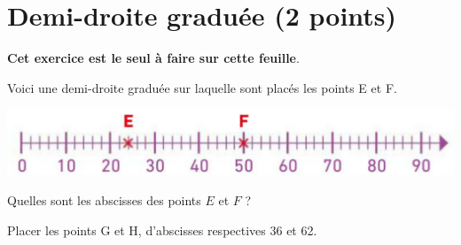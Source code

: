 \section{Demi-droite graduée (2 points)}

{\Large \textbf{Cet exercice est le seul à faire sur cette feuille}.} 

Voici une demi-droite graduée sur laquelle sont placés les points E et F.

\begin{center}
	\includegraphics[scale=0.55]{img/droites2}
\end{center}

\begin{questions}
	\question[1] Quelles sont les abscisses des points $E$ et $F$ ?
	
	\question[1] Placer les points G et H, d'abscisses respectives 36 et 62.
\end{questions}